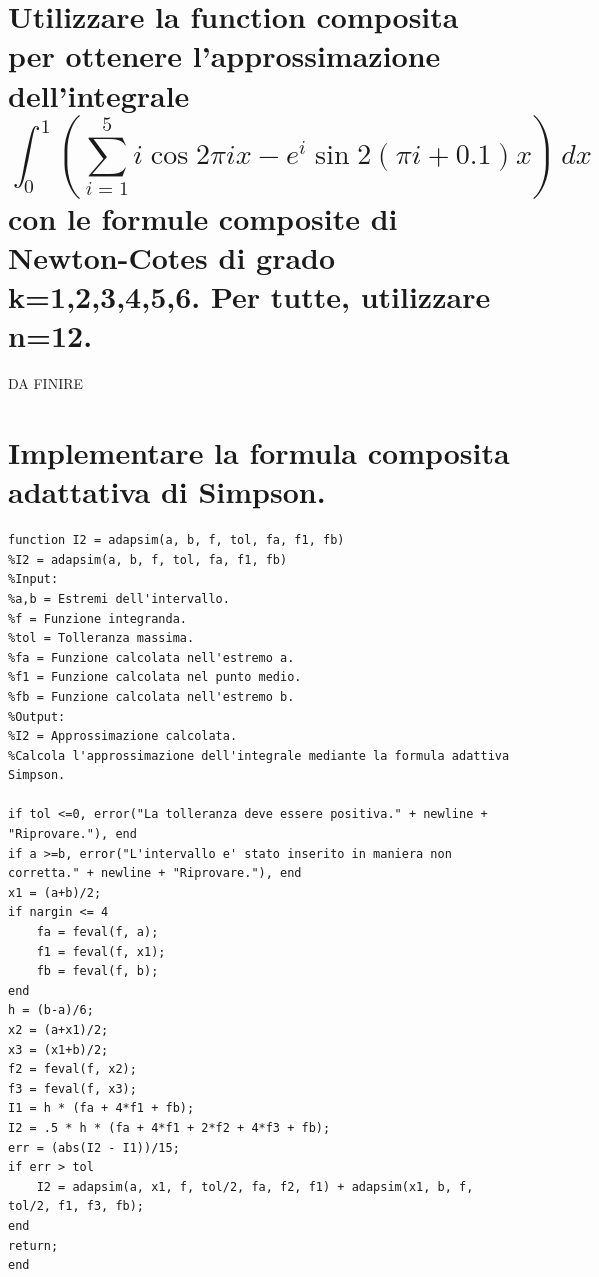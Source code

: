 \documentclass[10pt,a4paper]{article}
\begin{document}
\section{
Utilizzare la function \textbf{composita} per ottenere l'approssimazione dell'integrale
$$
  \int_{0}^{1}
  (\sum_{i=1}^{5} i \cos 2 \pi ix - e^i \sin 2(\pi i + 0.1)x)
  \, dx
$$
con le formule composite di Newton-Cotes di grado \textbf{k=1,2,3,4,5,6}. Per tutte, utilizzare \textbf{n=12}.
}
DA FINIRE

\section{
  Implementare la formula composita adattativa di Simpson.
 }
\begin{lstlisting}[style=Matlab-editor]
function I2 = adapsim(a, b, f, tol, fa, f1, fb)
%I2 = adapsim(a, b, f, tol, fa, f1, fb)
%Input:
%a,b = Estremi dell'intervallo.
%f = Funzione integranda.
%tol = Tolleranza massima.
%fa = Funzione calcolata nell'estremo a.
%f1 = Funzione calcolata nel punto medio.
%fb = Funzione calcolata nell'estremo b.
%Output:
%I2 = Approssimazione calcolata.
%Calcola l'approssimazione dell'integrale mediante la formula adattiva Simpson.

if tol <=0, error("La tolleranza deve essere positiva." + newline + "Riprovare."), end
if a >=b, error("L'intervallo e' stato inserito in maniera non corretta." + newline + "Riprovare."), end
x1 = (a+b)/2;
if nargin <= 4
    fa = feval(f, a);
    f1 = feval(f, x1);
    fb = feval(f, b);
end
h = (b-a)/6;
x2 = (a+x1)/2;
x3 = (x1+b)/2;
f2 = feval(f, x2);
f3 = feval(f, x3);
I1 = h * (fa + 4*f1 + fb);
I2 = .5 * h * (fa + 4*f1 + 2*f2 + 4*f3 + fb);
err = (abs(I2 - I1))/15;
if err > tol
    I2 = adapsim(a, x1, f, tol/2, fa, f2, f1) + adapsim(x1, b, f, tol/2, f1, f3, fb);
end
return;
end  
\end{lstlisting}
\end{document}
